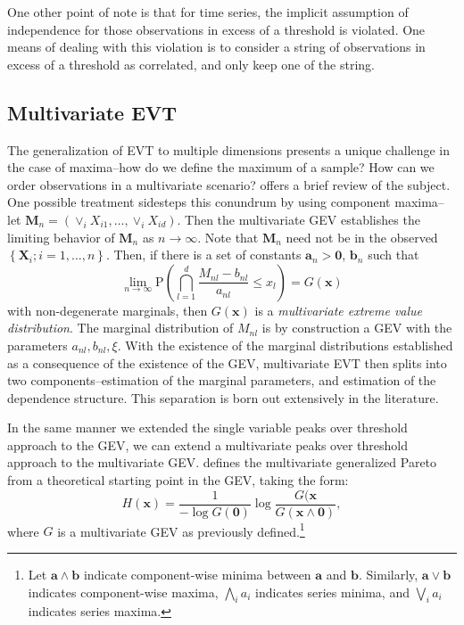 One other point of note is that for time series, the implicit assumption of independence for those
  observations in excess of a threshold is violated.  One means of dealing with this violation is
  to consider a string of observations in excess of a threshold as correlated, and only keep one
  of the string.

\subsection{Multivariate EVT}
The generalization of EVT to multiple dimensions presents a unique challenge in the case of maxima--how
  do we define the maximum of a sample?  How can we order observations in a multivariate scenario?
  \cite{rootzen2006} offers a brief review of the subject.  One possible treatment sidesteps this
  conundrum by using component maxima--let $\bm{M}_n = \left(\vee_i X_{i1},\ldots,\vee_i X_{id}\right)$.
  Then the multivariate GEV establishes the limiting behavior of $\bm{M}_n$ as $n\to\infty$.  Note
  that $\bm{M}_n$ need not be in the observed $\left\lbrace\bm{X}_i; i = 1,\ldots,n\right\rbrace$.
  Then, if there is a set of constants $\bm{a}_n > \bm{0}$, $\bm{b}_n$ such that
  \begin{equation*}
    \lim\limits_{n\to\infty}\text{P}\left(\bigcap_{l = 1}^d \frac{M_{nl} - b_{nl}}{a_{nl}} \leq x_l\right) = G(\bm{x})
  \end{equation*}
  with non-degenerate marginals, then $G(\bm{x})$ is a \emph{multivariate extreme value distribution}.
  The marginal distribution of $M_{nl}$ is by construction a GEV with the parameters $a_{nl}, b_{nl}, \xi$.
  With the existence of the marginal distributions established as a consequence of the existence of the
  GEV, multivariate EVT then splits into two components--estimation of the marginal parameters, and
  estimation of the dependence structure.  This separation is born out extensively in the literature.

In the same manner we extended the single variable peaks over threshold approach to the GEV, we can
  extend a multivariate peaks over threshold approach to the multivariate GEV.  \citet{rootzen2006}
  defines the multivariate generalized Pareto from a theoretical starting point in the GEV, taking
  the form:
  \begin{equation*}
    H(\bm{x}) = \frac{1}{-\log G(\bm{0})}\log\frac{G(\bm{x}}{G(\bm{x}\wedge \bm{0})},
  \end{equation*}
  where $G$ is a multivariate GEV as previously defined.\footnote{Let $\bm{a}\wedge\bm{b}$ indicate
  component-wise minima between $\bm{a}$ and $\bm{b}$.  Similarly, $\bm{a}\vee\bm{b}$ indicates
  component-wise maxima, $\bigwedge_{i}a_i$ indicates series minima, and $\bigvee_ia_i$ indicates
  series maxima.}

